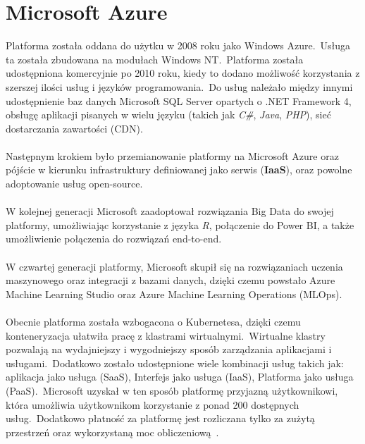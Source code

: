 \section{Microsoft Azure}
Platforma została oddana do użytku w 2008 roku jako Windows Azure.\ Usługa ta została zbudowana na modułach Windows NT.\ Platforma została udostępniona komercyjnie po 2010 roku, kiedy to dodano możliwość korzystania z szerszej ilości usług i języków programowania.\ Do usług należało między innymi udostępnienie baz danych Microsoft SQL Server opartych o .NET Framework 4, obsługę aplikacji pisanych w wielu języku (takich jak \textit{C\#}, \textit{Java}, \textit{PHP}), sieć dostarczania zawartości  (CDN).
\\ \\
Następnym krokiem było przemianowanie platformy na Microsoft Azure oraz pójście w kierunku infrastruktury definiowanej jako serwis  (\textbf{IaaS}), oraz powolne adoptowanie usług open-source.
\\ \\
W kolejnej generacji Microsoft zaadoptował rozwiązania Big Data do swojej platformy, umożliwiając korzystanie z języka \textit{R}, połączenie do Power BI, a także umożliwienie połączenia do rozwiązań end-to-end.
\\ \\
W czwartej generacji platformy, Microsoft skupił się na rozwiązaniach uczenia maszynowego oraz integracji z bazami danych, dzięki czemu powstało Azure Machine Learning Studio oraz Azure Machine Learning Operations (MLOps).
\\ \\
Obecnie platforma została wzbogacona o Kubernetesa, dzięki czemu konteneryzacja ułatwiła pracę z klastrami wirtualnymi.\ Wirtualne klastry pozwalają na wydajniejszy i wygodniejszy sposób zarządzania aplikacjami i usługami.\ Dodatkowo zostało udostępnione wiele kombinacji usług takich jak: aplikacja jako usługa  (SaaS), Interfejs jako usługa  (IaaS), Platforma jako usługa  (PaaS).\ Microsoft uzyskał w ten sposób platformę przyjazną użytkownikowi, która umożliwia użytkownikom korzystanie z ponad 200 dostępnych usług.\ Dodatkowo płatność za platformę jest rozliczana tylko za zużytą przestrzeń oraz wykorzystaną moc obliczeniową~\cite{Roosevelt2022, MicrosoftAzurec, Datashift}.

\vfill
\pagebreak

